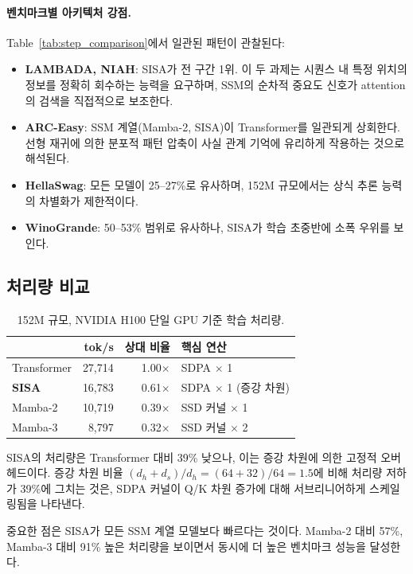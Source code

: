 \documentclass[11pt]{article}
\begin{document}
\paragraph{벤치마크별 아키텍처 강점.} Table~\ref{tab:step_comparison}에서 일관된 패턴이 관찰된다:
\begin{itemize}[leftmargin=*]
\item \textbf{LAMBADA, NIAH}: SISA가 전 구간 1위. 이 두 과제는 시퀀스 내 특정 위치의 정보를 정확히 회수하는 능력을 요구하며, SSM의 순차적 중요도 신호가 attention의 검색을 직접적으로 보조한다.
\item \textbf{ARC-Easy}: SSM 계열(Mamba-2, SISA)이 Transformer를 일관되게 상회한다. 선형 재귀에 의한 분포적 패턴 압축이 사실 관계 기억에 유리하게 작용하는 것으로 해석된다.
\item \textbf{HellaSwag}: 모든 모델이 25--27\%로 유사하며, 152M 규모에서는 상식 추론 능력의 차별화가 제한적이다.
\item \textbf{WinoGrande}: 50--53\% 범위로 유사하나, SISA가 학습 초중반에 소폭 우위를 보인다.
\end{itemize}

\subsection{처리량 비교}

\begin{table}[h]
\centering
\caption{152M 규모, NVIDIA H100 단일 GPU 기준 학습 처리량.}
\label{tab:throughput}
\begin{tabular}{lrrl}
\toprule
& \textbf{tok/s} & \textbf{상대 비율} & \textbf{핵심 연산} \\
\midrule
Transformer & 27,714 & 1.00$\times$ & SDPA $\times$ 1 \\
\textbf{SISA} & 16,783 & 0.61$\times$ & SDPA $\times$ 1 (증강 차원) \\
Mamba-2 & 10,719 & 0.39$\times$ & SSD 커널 $\times$ 1 \\
Mamba-3 & 8,797 & 0.32$\times$ & SSD 커널 $\times$ 2 \\
\bottomrule
\end{tabular}
\end{table}

SISA의 처리량은 Transformer 대비 39\% 낮으나, 이는 증강 차원에 의한 고정적 오버헤드이다. 증강 차원 비율 $(d_h + d_s) / d_h = (64 + 32) / 64 = 1.5$에 비해 처리량 저하가 39\%에 그치는 것은, SDPA 커널이 Q/K 차원 증가에 대해 서브리니어하게 스케일링됨을 나타낸다.

중요한 점은 SISA가 모든 SSM 계열 모델보다 빠르다는 것이다. Mamba-2 대비 57\%, Mamba-3 대비 91\% 높은 처리량을 보이면서 동시에 더 높은 벤치마크 성능을 달성한다.
\end{document}
